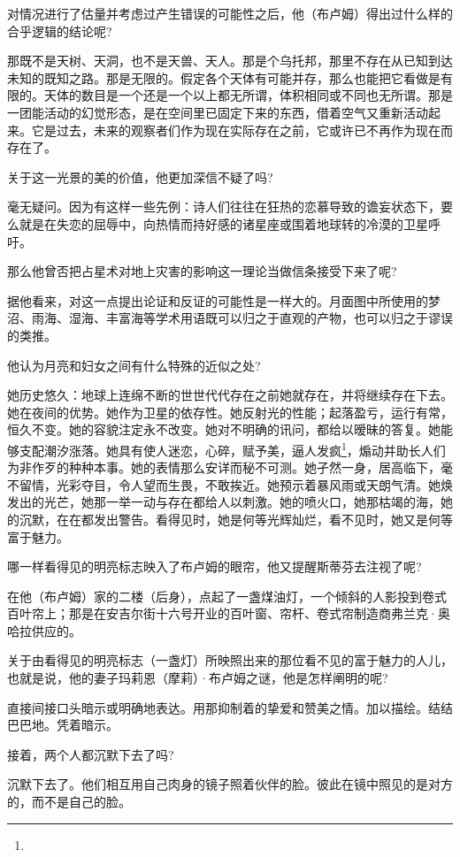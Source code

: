 \par 对情况进行了估量并考虑过产生错误的可能性之后，他（布卢姆）得出过什么样的合乎逻辑的结论呢?
\par 那既不是天树、天洞，也不是天兽、天人。那是个乌托邦，那里不存在从已知到达未知的既知之路。那是无限的。假定各个天体有可能并存，那么也能把它看做是有限的。天体的数目是一个还是一个以上都无所谓，体积相同或不同也无所谓。那是一团能活动的幻觉形态，是在空间里已固定下来的东西，借着空气又重新活动起来。它是过去，未来的观察者们作为现在实际存在之前，它或许已不再作为现在而存在了。
\par 关于这一光景的美的价值，他更加深信不疑了吗?
\par 毫无疑问。因为有这样一些先例：诗人们往往在狂热的恋慕导致的谵妄状态下，要么就是在失恋的屈辱中，向热情而持好感的诸星座或围着地球转的冷漠的卫星呼吁。
\par 那么他曾否把占星术对地上灾害的影响这一理论当做信条接受下来了呢?
\par 据他看来，对这一点提出论证和反证的可能性是一样大的。月面图中所使用的梦沼、雨海、湿海、丰富海等学术用语既可以归之于直观的产物，也可以归之于谬误的类推。
\par 他认为月亮和妇女之间有什么特殊的近似之处?
\par 她历史悠久：地球上连绵不断的世世代代存在之前她就存在，并将继续存在下去。她在夜间的优势。她作为卫星的依存性。她反射光的性能；起落盈亏，运行有常，恒久不变。她的容貌注定永不改变。她对不明确的讯问，都给以暧昧的答复。她能够支配潮汐涨落。她具有使人迷恋，心碎，赋予美，逼人发疯\footnote{}，煽动并助长人们为非作歹的种种本事。她的表情那么安详而秘不可测。她孑然一身，居高临下，毫不留情，光彩夺目，令人望而生畏，不敢挨近。她预示着暴风雨或天朗气清。她焕发出的光芒，她那一举一动与存在都给人以刺激。她的喷火口，她那枯竭的海，她的沉默，在在都发出警告。看得见时，她是何等光辉灿烂，看不见时，她又是何等富于魅力。
\par 哪一样看得见的明亮标志映入了布卢姆的眼帘，他又提醒斯蒂芬去注视了呢?
\par 在他（布卢姆）家的二楼（后身），点起了一盏煤油灯，一个倾斜的人影投到卷式百叶帘上；那是在安吉尔街十六号开业的百叶窗、帘杆、卷式帘制造商弗兰克·奥哈拉供应的。
\par 关于由看得见的明亮标志（一盏灯）所映照出来的那位看不见的富于魅力的人儿，也就是说，他的妻子玛莉恩（摩莉）·布卢姆之谜，他是怎样阐明的呢?
\par 直接间接口头暗示或明确地表达。用那抑制着的挚爱和赞美之情。加以描绘。结结巴巴地。凭着暗示。
\par 接着，两个人都沉默下去了吗?
\par 沉默下去了。他们相互用自己肉身的镜子照着伙伴的脸。彼此在镜中照见的是对方的，而不是自己的脸。
